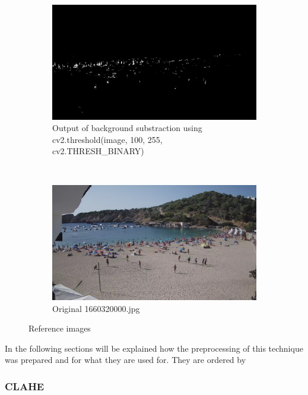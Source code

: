 \documentclass[11pt]{article}
\begin{document}
\begin{figure}[h]
  \begin{subfigure}[t]{0.5\textwidth}
    \centering
    \includegraphics[width=\textwidth]{img/bin_ex.jpg}
    \caption{Output of background substraction using cv2.threshold(image, 100, 255, cv2.THRESH\_BINARY)}
    \label{fig:y equals x}
  \end{subfigure}
  ~
  \begin{subfigure}[t]{0.5\textwidth}
    \centering
    \includegraphics[width=\textwidth]{img/or_ex.jpg}
    \caption{Original 1660320000.jpg}
    \label{fig:y equals x}
  \end{subfigure}

  \caption{Reference images}
  \label{fig: img_reference}
\end{figure}
\FloatBarrier
In the following sections will be explained how the preprocessing of this technique was prepared and for what they are used for. They are ordered by

\subsubsection*{CLAHE}
\end{document}
